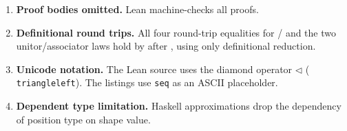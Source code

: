 \documentclass[11pt,a4paper]{article}
\begin{document}
\begin{enumerate}
\item \textbf{Proof bodies omitted.}  Lean machine-checks all proofs.

\item \textbf{Definitional round trips.}  All four round-trip equalities for
  / and the two unitor/associator laws hold
  by  after , using only definitional reduction.

\item \textbf{Unicode notation.}  The Lean source uses the diamond operator
  $\triangleleft$ (\texttt{\\triangleleft}).  The listings use
  \texttt{seq} as an ASCII placeholder.

\item \textbf{Dependent type limitation.}  Haskell approximations drop
  the dependency of position type on shape value.
\end{enumerate}
\end{document}
